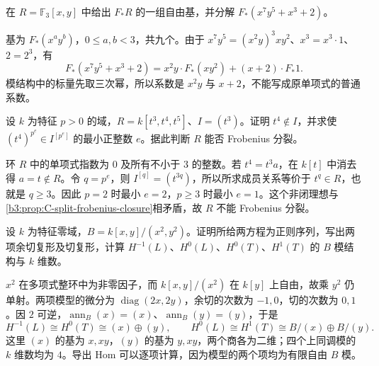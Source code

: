 \begin{exercise}\label{b3:ex:C-frobenius-basis}
	在 \(R=\mathbb F_3[x,y]\) 中给出 \(F_*R\) 的一组自由基，并分解 \(F_*(x^7y^5+x^3+2)\)。
\end{exercise}
\begin{solution}
	基为 \(F_*(x^ay^b)\)，\(0\le a,b<3\)，共九个。由于 \(x^7y^5=(x^2y)^3xy^2\)、\(x^3=x^3\cdot1\)、\(2=2^3\)，有
	\[
		F_*(x^7y^5+x^3+2)=x^2y\cdot F_*(xy^2)+(x+2)\cdot F_*1.
	\]
	模结构中的标量先取三次幂，所以系数是 \(x^2y\) 与 \(x+2\)，不能写成原单项式的普通系数。
\end{solution}

\begin{exercise}\label{b3:ex:C-frobenius-closure-cusp}
	设 \(k\) 为特征 \(p>0\) 的域，\(R=k[t^3,t^4,t^5]\)、\(I=(t^3)\)。证明 \(t^4\notin I\)，并求使 \((t^4)^{p^e}\in I^{[p^e]}\) 的最小正整数 \(e\)。据此判断 \(R\) 能否 Frobenius 分裂。
\end{exercise}
\begin{solution}
	环 \(R\) 中的单项式指数为 \(0\) 及所有不小于 \(3\) 的整数。若 \(t^4=t^3a\)，在 \(k[t]\) 中消去得 \(a=t\notin R\)。令 \(q=p^e\)，则 \(I^{[q]}=(t^{3q})\)，所以所求成员关系等价于 \(t^q\in R\)，也就是 \(q\ge3\)。因此 \(p=2\) 时最小 \(e=2\)，\(p\ge3\) 时最小 \(e=1\)。这个非闭理想与\cref{b3:prop:C-split-frobenius-closure}相矛盾，故 \(R\) 不能 Frobenius 分裂。
\end{solution}

\begin{exercise}\label{b3:ex:C-dual-numbers-cotangent}
	设 \(k\) 为特征零域，\(B=k[x,y]/(x^2,y^2)\)。证明所给两方程为正则序列，写出两项余切复形及切复形，计算 \(H^{-1}(L)\)、\(H^0(L)\)、\(H^0(T)\)、\(H^1(T)\) 的 \(B\) 模结构与 \(k\) 维数。
\end{exercise}
\begin{solution}
	\(x^2\) 在多项式整环中为非零因子，而 \(k[x,y]/(x^2)\) 在 \(k[y]\) 上自由，故乘 \(y^2\) 仍单射。两项模型的微分为 \(\operatorname{diag}(2x,2y)\)，余切的次数为 \(-1,0\)，切的次数为 \(0,1\)。因 \(2\) 可逆，\(\operatorname{ann}_B(x)=(x)\)、\(\operatorname{ann}_B(y)=(y)\)，于是
	\[
		H^{-1}(L)\cong H^0(T)\cong(x)\oplus(y),\qquad H^0(L)\cong H^1(T)\cong B/(x)\oplus B/(y).
	\]
	这里 \((x)\) 的基为 \(x,xy\)，\((y)\) 的基为 \(y,xy\)，两个商各为二维；四个上同调模的 \(k\) 维数均为 \(4\)。导出 Hom 可以逐项计算，因为模型的两个项均为有限自由 \(B\) 模。
\end{solution}

